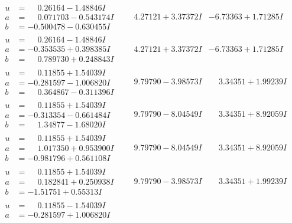 \documentclass[1p]{elsarticle_modified}
\theoremstyle{definition}
\begin{document}
$$\begin{array}{c|c|c}
\begin{aligned}
u &= \phantom{-}0.26164 - 1.48846 I \\
a &= \phantom{-}0.071703 - 0.543174 I \\
b &= -0.500478 - 0.630455 I\end{aligned}
 & \phantom{-}4.27121 + 3.37372 I & -6.73363 + 1.71285 I \\ \hline\begin{aligned}
u &= \phantom{-}0.26164 - 1.48846 I \\
a &= -0.353535 + 0.398385 I \\
b &= \phantom{-}0.789730 + 0.248843 I\end{aligned}
 & \phantom{-}4.27121 + 3.37372 I & -6.73363 + 1.71285 I \\ \hline\begin{aligned}
u &= \phantom{-}0.11855 + 1.54039 I \\
a &= -0.281597 - 1.006820 I \\
b &= \phantom{-}0.364867 - 0.311396 I\end{aligned}
 & \phantom{-}9.79790 - 3.98573 I & \phantom{-}3.34351 + 1.99239 I \\ \hline\begin{aligned}
u &= \phantom{-}0.11855 + 1.54039 I \\
a &= -0.313354 - 0.661484 I \\
b &= \phantom{-}1.34877 - 1.68020 I\end{aligned}
 & \phantom{-}9.79790 - 8.04549 I & \phantom{-}3.34351 + 8.92059 I \\ \hline\begin{aligned}
u &= \phantom{-}0.11855 + 1.54039 I \\
a &= \phantom{-}1.017350 + 0.953900 I \\
b &= -0.981796 + 0.561108 I\end{aligned}
 & \phantom{-}9.79790 - 8.04549 I & \phantom{-}3.34351 + 8.92059 I \\ \hline\begin{aligned}
u &= \phantom{-}0.11855 + 1.54039 I \\
a &= \phantom{-}0.182841 + 0.250938 I \\
b &= -1.51751 + 0.55313 I\end{aligned}
 & \phantom{-}9.79790 - 3.98573 I & \phantom{-}3.34351 + 1.99239 I \\ \hline\begin{aligned}
u &= \phantom{-}0.11855 - 1.54039 I \\
a &= -0.281597 + 1.006820 I \\

\end{aligned}
\end{array}$$
\end{document}
